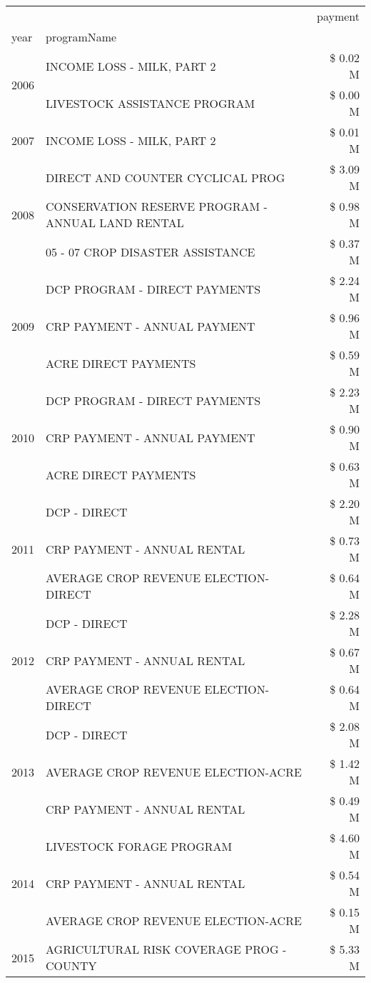 \begin{tabular}{llr}
\toprule
 &  & payment \\
year & programName &  \\
\midrule
\multirow[t]{2}{*}{2006} & INCOME LOSS - MILK, PART 2 & \$ 0.02 M \\
 & LIVESTOCK ASSISTANCE PROGRAM & \$ 0.00 M \\
\cline{1-3}
2007 & INCOME LOSS - MILK, PART 2 & \$ 0.01 M \\
\cline{1-3}
\multirow[t]{3}{*}{2008} & DIRECT AND COUNTER CYCLICAL PROG & \$ 3.09 M \\
 & CONSERVATION RESERVE PROGRAM - ANNUAL LAND RENTAL & \$ 0.98 M \\
 & 05 - 07 CROP DISASTER ASSISTANCE & \$ 0.37 M \\
\cline{1-3}
\multirow[t]{3}{*}{2009} & DCP PROGRAM - DIRECT PAYMENTS & \$ 2.24 M \\
 & CRP PAYMENT - ANNUAL PAYMENT & \$ 0.96 M \\
 & ACRE DIRECT PAYMENTS & \$ 0.59 M \\
\cline{1-3}
\multirow[t]{3}{*}{2010} & DCP PROGRAM - DIRECT PAYMENTS & \$ 2.23 M \\
 & CRP PAYMENT - ANNUAL PAYMENT & \$ 0.90 M \\
 & ACRE DIRECT PAYMENTS & \$ 0.63 M \\
\cline{1-3}
\multirow[t]{3}{*}{2011} & DCP - DIRECT & \$ 2.20 M \\
 & CRP PAYMENT - ANNUAL RENTAL & \$ 0.73 M \\
 & AVERAGE CROP REVENUE ELECTION-DIRECT & \$ 0.64 M \\
\cline{1-3}
\multirow[t]{3}{*}{2012} & DCP - DIRECT & \$ 2.28 M \\
 & CRP PAYMENT - ANNUAL RENTAL & \$ 0.67 M \\
 & AVERAGE CROP REVENUE ELECTION-DIRECT & \$ 0.64 M \\
\cline{1-3}
\multirow[t]{3}{*}{2013} & DCP - DIRECT & \$ 2.08 M \\
 & AVERAGE CROP REVENUE ELECTION-ACRE & \$ 1.42 M \\
 & CRP PAYMENT - ANNUAL RENTAL & \$ 0.49 M \\
\cline{1-3}
\multirow[t]{3}{*}{2014} & LIVESTOCK FORAGE PROGRAM & \$ 4.60 M \\
 & CRP PAYMENT - ANNUAL RENTAL & \$ 0.54 M \\
 & AVERAGE CROP REVENUE ELECTION-ACRE & \$ 0.15 M \\
\cline{1-3}
\multirow[t]{3}{*}{2015} & AGRICULTURAL RISK COVERAGE PROG - COUNTY & \$ 5.33 M \\

\end{tabular}
